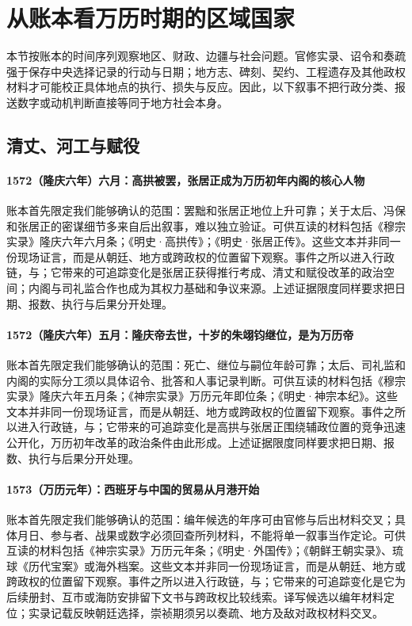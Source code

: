 \section{从账本看万历时期的区域国家}

本节按账本的时间序列观察地区、财政、边疆与社会问题。官修实录、诏令和奏疏强于保存中央选择记录的行动与日期；地方志、碑刻、契约、工程遗存及其他政权材料才可能校正具体地点的执行、损失与反应。因此，以下叙事不把行政分类、报送数字或动机判断直接等同于地方社会本身。

\subsection{清丈、河工与赋役}

\paragraph{1572（隆庆六年）六月：高拱被罢，张居正成为万历初年内阁的核心人物} 账本首先限定我们能够确认的范围：罢黜和张居正地位上升可靠；关于太后、冯保和张居正的密谋细节多来自后出叙事，难以独立验证。可供互读的材料包括《穆宗实录》隆庆六年六月条；《明史·高拱传》；《明史·张居正传》。这些文本并非同一份现场证言，而是从朝廷、地方或跨政权的位置留下观察。事件之所以进入行政链，与；它带来的可追踪变化是张居正获得推行考成、清丈和赋役改革的政治空间；内阁与司礼监合作也成为其权力基础和争议来源。上述证据限度同样要求把日期、报数、执行与后果分开处理。

\paragraph{1572（隆庆六年）五月：隆庆帝去世，十岁的朱翊钧继位，是为万历帝} 账本首先限定我们能够确认的范围：死亡、继位与嗣位年龄可靠；太后、司礼监和内阁的实际分工须以具体诏令、批答和人事记录判断。可供互读的材料包括《穆宗实录》隆庆六年五月条；《神宗实录》万历元年即位条；《明史·神宗本纪》。这些文本并非同一份现场证言，而是从朝廷、地方或跨政权的位置留下观察。事件之所以进入行政链，与；它带来的可追踪变化是高拱与张居正围绕辅政位置的竞争迅速公开化，万历初年改革的政治条件由此形成。上述证据限度同样要求把日期、报数、执行与后果分开处理。

\paragraph{1573（万历元年）：西班牙与中国的贸易从月港开始} 账本首先限定我们能够确认的范围：编年候选的年序可由官修与后出材料交叉；具体月日、参与者、战果或数字必须回查所列材料，不能将单一叙事当作定论。可供互读的材料包括《神宗实录》万历元年条；《明史·外国传》；《朝鲜王朝实录》、琉球《历代宝案》或海外档案。这些文本并非同一份现场证言，而是从朝廷、地方或跨政权的位置留下观察。事件之所以进入行政链，与；它带来的可追踪变化是它为后续册封、互市或海防安排留下文书与跨政权比较线索。译写候选以编年材料定位；实录记载反映朝廷选择，崇祯期须另以奏疏、地方及敌对政权材料交叉。

